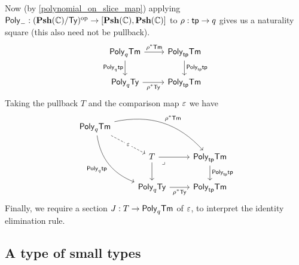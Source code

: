 Now (by \cref{polynomial_on_slice_map})
applying $\mathsf{Poly}_{-} : (\mathbf{Psh}(\mathbb{C}) / \mathsf{Ty}) ^{\mathrm{op}} \to [\mathbf{Psh}(\mathbb{C}), \mathbf{Psh}(\mathbb{C})]$ to $\rho : \mathsf{tp} \to q$
gives us a naturality square (this also need not be pullback).
\[\begin{tikzcd}
	{\Poly{q} {\Term}} & {\Poly{\tp} {\Term}} \\
	{\Poly{q} {\Type}} & {\Poly{\tp} {\Term}}
	\arrow["{{\rho}^*{\Term}}", from=1-1, to=1-2]
	\arrow["{\Poly{q} {\tp}}"', from=1-1, to=2-1]
	\arrow["{\Poly{\tp} {\tp}}", from=1-2, to=2-2]
	\arrow["{{\rho}^*{\Type}}"', from=2-1, to=2-2]
\end{tikzcd}\]
Taking the pullback $T$ and the comparison map $\varepsilon$ we have
\[\begin{tikzcd}
	{\Poly{q} {\Term}} \\
	& T & {\Poly{\tp} {\Term}} \\
	& {\Poly{q} {\Type}} & {\Poly{\tp} {\Term}}
	\arrow["\ep"{description}, dashed, from=1-1, to=2-2]
	\arrow["{{\rho}^*{\Term}}", bend left, from=1-1, to=2-3]
	\arrow["{\Poly{q} {\tp}}"', bend right, from=1-1, to=3-2]
	\arrow[from=2-2, to=2-3]
	\arrow[from=2-2, to=3-2]
	\arrow["\lrcorner"{anchor=center, pos=0.125}, draw=none, from=2-2, to=3-3]
	\arrow["{\Poly{\tp} {\tp}}", from=2-3, to=3-3]
	\arrow["{{\rho}^*{\Type}}"', from=3-2, to=3-3]
\end{tikzcd}\]
Finally, we require a section $J : T \to \mathsf{Poly}_{q}{\mathsf{Tm}}$ of $\varepsilon$,
to interpret the identity elimination rule.

\subsection{A type of small types}

